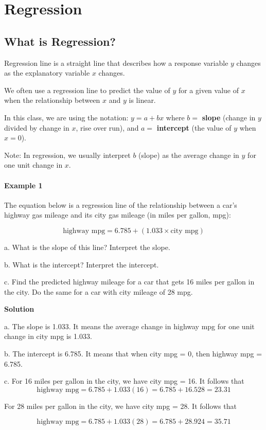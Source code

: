 \chapter{Regression}

\section{What is Regression?}
Regression line is a straight line that describes how a response variable $y$ changes as the explanatory variable $x$ changes.

We often use a regression line to predict the value of $y$ for a given value of $x$ when the relationship between $x$ and $y$ is linear.

\vspace{0.2cm}

In this class, we are using the notation: $y=a+bx$ where $b =$ \textbf{slope} (change in $y$ divided by change in $x$, rise over run), and $a =$ \textbf{intercept} (the value of $y$ when $x=0$).

Note: In regression, we usually interpret $b$ (slope) as the average change in $y$ for one unit change in $x$. 


\subsubsection*{Example 1}
The equation below is a regression line of the relationship between a car’s highway gas mileage and its city gas mileage (in miles per gallon, mpg):

\[
\text{highway mpg} = 6.785 + (1.033 \times \text{city mpg})
\]

\noindent a. What is the slope of this line? Interpret the slope. 

\noindent b. What is the intercept? Interpret the intercept. 

\noindent c. Find the predicted highway mileage for a car that gets 16 miles per gallon in the city. Do the same for a car with city mileage of 28 mpg.  

\vspace{0.2cm}

\textbf{Solution}

\vspace{0.2cm}

\noindent a. The slope is 1.033. It means the average change in highway mpg for one unit change in city mpg is 1.033.

\vspace{0.2cm}

\noindent b. The intercept is 6.785. It means that when city mpg = 0, then highway mpg = 6.785. 

\vspace{0.2cm}

\noindent c. For 16 miles per gallon in the city, we have city mpg = 16. It follows that
\[
\text{highway mpg} = 6.785 + 1.033(16) = 6.785 + 16.528 = 23.31
\]

For 28 miles per gallon in the city, we have city mpg = 28. It follows that

\[
\text{highway mpg} = 6.785 + 1.033(28) = 6.785 + 28.924 = 35.71
\]

